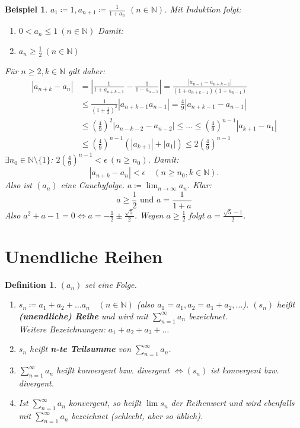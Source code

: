 \documentclass[titlepage,ngerman,a4paper,headsepline]{scrartcl}
\newcommand{\N}{\mathbb{N}}
\theoremstyle{named}
\theoremstyle{dotless}
\newtheorem*{beispiel*}{Beispiel}
\newtheorem*{definition}{Definition}
\begin{document}
\begin{beispiel*}
	$a_{1} \coloneqq 1, a_{n+1} \coloneqq \frac{1}{1 + a_{n}}$ $(n \in \N)$. Mit Induktion folgt:
	\begin{enumerate}
		\item[1)] $0 < a_{n} \leq 1 ~(n \in \N)$ Damit:
		\item[2)] $a_{n} \geq \frac{1}{2} ~(n \in \N)$
	\end{enumerate}
	Für $n \geq 2, k \in \N$ gilt daher:
	\begin{align*}
		|a_{n+k} - a_{n} | & = \left| \frac{1}{1+a_{n+k-1}} - \frac{1}{1 - a_{n - 1}} \right| = \frac{|a_{n-1} - a_{n +k-1}|}{(1+a_{n+k-1})(1+a_{n-1})} \\
			& \leq \frac{1}{(1+\frac{1}{2})^{2}} |a_{n+k-1} a_{n-1}| = \frac{4}{9} |a_{n+k-1} - a_{n-1}| \\
			& \leq \left(\frac{4}{9} \right)^{2} |a_{n-k-2} - a_{n-2}| \leq \dotsc \leq \left( \frac{4}{9} \right)^{n-1} |a_{k+1} - a_{1}| \\
			& \leq \left( \frac{4}{9} \right)^{n-1} \left( |a_{k+1}| + |a_{1}|\right) \leq 2 \left( \frac{4}{9} \right)^{n-1} 
	\end{align*}
	$\exists n_{0} \in \N \setminus \{ 1 \}$: $2\left(\frac{4}{9}\right)^{n-1} < \epsilon ~(n \geq n_{0})$. Damit: 
		$$ |a_{n+k} - a_{n}| < \epsilon \quad (n \geq n_{0}, k \in \N). $$
	Also ist $(a_{n})$ eine Cauchyfolge. $a \coloneqq \lim_{n \rightarrow \infty} a_{n}$. Klar: 
	$$ a \geq \frac{1}{2} \text{ und } a = \frac{1}{1 + a} $$
	Also $a^{2} + a - 1 = 0 \iff a = - \frac{1}{2} \pm \frac{\sqrt{5}}{2}$. Wegen $a \geq \frac{1}{2}$ folgt $a = \frac{\sqrt{5} - 1}{2}$.
\end{beispiel*}


\newpage


\section{Unendliche Reihen}


     
\begin{definition} $(a_{n})$ sei eine Folge.
	\begin{enumerate}
		\item $ s_{n} \coloneqq a_{1} + a_{2} + \dotsc a_{n} \quad (n \in \N)$
		(also $a_{1} = a_{1}, a_{2} = a_{1} + a_{2}, \dotsc$). $(s_{n})$ hei{\ss}t \textbf{(unendliche) Reihe} und wird mit $\sum_{n = 1}^{\infty} a_{n}$ bezeichnet. \\
		Weitere Bezeichnungen: $a_{1} + a_{2} + a_{3} + \dotsc$
		\item $s_{n}$ hei{\ss}t \textbf{n-te Teilsumme} von $\sum_{n=1}^{\infty} a_{n}$.	
		\item $\sum_{n=1}^{\infty} a_{n}$ hei{\ss}t konvergent bzw. divergent $\iff (s_{n})$ ist konvergent 	bzw. divergent.
		\item Ist $\sum_{n = 1}^{\infty} a_{n}$ konvergent, so hei{\ss}t $\lim s_{n}$ der Reihenwert und wird ebenfalls mit $\sum_{n=1}^{\infty} a_{n}$ bezeichnet (schlecht, aber so üblich).
	\end{enumerate} 	
\end{definition}
\end{document}
